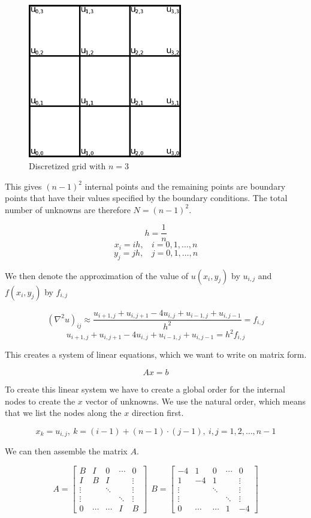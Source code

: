 \begin{figure}[ht]
	\center
	\includegraphics[width=0.6\textwidth]{images/2d_poisson_ex}
	\caption{Discretized grid with $n = 3$}
	\label{fig:discgrid}
\end{figure}

This gives $(n-1)^2$ internal points and the remaining points are boundary
points that have their values specified by the boundary conditions. The total
number of unknowns are therefore $N = (n-1)^2$.

$$h = \frac{1}{n}$$
$$x_i = ih, ~~~~ i = 0, 1, \dots, n$$
$$y_j = jh, ~~~~ j = 0, 1, \dots, n$$

We then denote the approximation of the value of $u(x_i, y_j)$ by $u_{i,j}$ and 
$f(x_i, y_j)$ by $f_{i,j}$

$$ (\nabla^2 u)_{ij} \approx \frac{u_{i+1,j} + u_{i,j+1} - 4u_{i,j} + u_{i-1,j} + u_{i,j-1}}{h^2} = f_{i,j} $$
$$ u_{i+1,j} + u_{i,j+1} - 4u_{i,j} + u_{i-1,j} + u_{i,j-1} = h^2 f_{i,j} $$

This creates a system of linear equations, which we want to write on matrix form.

$$Ax = b$$

To create this linear system we have to create a global order for the
internal nodes to create the $x$ vector of unknowns. We use the natural
order, which means that we list the nodes along the $x$ direction first.

$$x_k = u_{i,j}, ~ k = (i-1) + (n-1) \cdot (j-1), ~ i, j = 1, 2, \dots, n-1$$

We can then assemble the matrix $A$.

$$
A = \begin{bmatrix}
 B & I & 0 & \cdots & 0 \\
 I & B & I &   & \vdots \\
 \vdots &   & \ddots &   & \vdots \\
 \vdots &   &   & \ddots & \vdots \\
 0 & \cdots & \cdots & I & B 
\end{bmatrix}
~~
B = \begin{bmatrix}
-4 & 1 & 0 & \cdots & 0 \\
 1 &-4 & 1 &   & \vdots \\
 \vdots &   & \ddots &   & \vdots \\
 \vdots &   &   & \ddots & \vdots \\
 0 & \cdots & \cdots & 1 &-4 
\end{bmatrix}
$$

